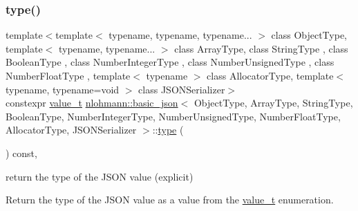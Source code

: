 \subsubsection{\texorpdfstring{type()}{type()}}
{\footnotesize\ttfamily template$<$template$<$ typename, typename, typename... $>$ class Object\+Type, template$<$ typename, typename... $>$ class Array\+Type, class String\+Type , class Boolean\+Type , class Number\+Integer\+Type , class Number\+Unsigned\+Type , class Number\+Float\+Type , template$<$ typename $>$ class Allocator\+Type, template$<$ typename, typename=void $>$ class J\+S\+O\+N\+Serializer$>$ \\
constexpr \hyperlink{namespacenlohmann_1_1detail_a1ed8fc6239da25abcaf681d30ace4985}{value\+\_\+t} \hyperlink{classnlohmann_1_1basic__json}{nlohmann\+::basic\+\_\+json}$<$ Object\+Type, Array\+Type, String\+Type, Boolean\+Type, Number\+Integer\+Type, Number\+Unsigned\+Type, Number\+Float\+Type, Allocator\+Type, J\+S\+O\+N\+Serializer $>$\+::\hyperlink{classstd_1_1conditional_1_1type}{type} (\begin{DoxyParamCaption}{ }\end{DoxyParamCaption}) const\hspace{0.3cm}{\ttfamily [inline]}, {\ttfamily [noexcept]}}



return the type of the J\+S\+ON value (explicit) 

Return the type of the J\+S\+ON value as a value from the \hyperlink{classnlohmann_1_1basic__json_ae8cbef097f7da18a781fc86587de6b90}{value\+\_\+t} enumeration.

